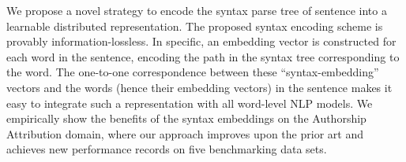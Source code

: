 We propose a novel strategy to encode the syntax parse tree of sentence into a learnable distributed representation. The proposed syntax encoding scheme is provably information-lossless. In specific, an embedding vector is constructed for each word in the sentence, encoding the path in the syntax tree corresponding to the word. The one-to-one correspondence between these ``syntax-embedding'' vectors and the words (hence their embedding vectors) in the sentence makes it easy to integrate such a representation with all word-level NLP models. We empirically show the benefits of the syntax embeddings on the Authorship Attribution domain, where our  approach improves upon the prior art and achieves new performance records on five benchmarking data sets.
